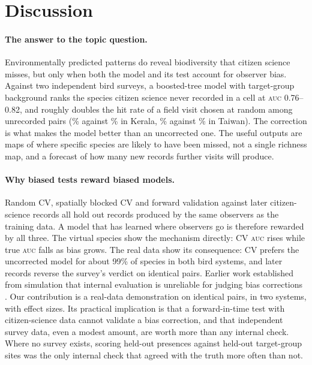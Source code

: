 \documentclass[11pt]{article}
\newcommand{\auc}{\textsc{auc}}
\begin{document}
\section{Discussion}

\paragraph{The answer to the topic question.} Environmentally predicted patterns do reveal biodiversity that citizen science misses, but only when both the model and its test account for observer bias. Against two independent bird surveys, a boosted-tree model with target-group background ranks the species citizen science never recorded in a cell at \auc{} 0.76--0.82, and roughly doubles the hit rate of a field visit chosen at random among unrecorded pairs (\KhitTGB\% against \Kbase\% in Kerala, \ThitTGB\% against \Tbase\% in Taiwan). The correction is what makes the model better than an uncorrected one. The useful outputs are maps of where specific species are likely to have been missed, not a single richness map, and a forecast of how many new records further visits will produce.

\paragraph{Why biased tests reward biased models.} Random CV, spatially blocked CV and forward validation against later citizen-science records all hold out records produced by the same observers as the training data. A model that has learned where observers go is therefore rewarded by all three. The virtual species show the mechanism directly: CV \auc{} rises while true \auc{} falls as bias grows. The real data show its consequence: CV prefers the uncorrected model for about 99\% of species in both bird systems, and later records reverse the survey's verdict on identical pairs. Earlier work established from simulation that internal evaluation is unreliable for judging bias corrections \citep{elgabbas2018,baker2024}. Our contribution is a real-data demonstration on identical pairs, in two systems, with effect sizes. Its practical implication is that a forward-in-time test with citizen-science data cannot validate a bias correction, and that independent survey data, even a modest amount, are worth more than any internal check. Where no survey exists, scoring held-out presences against held-out target-group sites was the only internal check that agreed with the truth more often than not.
\end{document}
